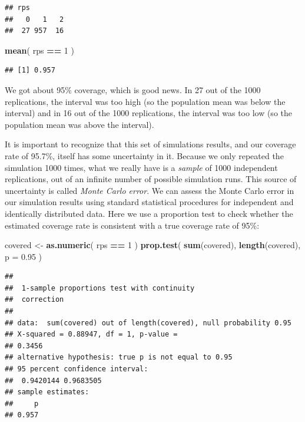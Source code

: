 \documentclass[
]{book}
\newenvironment{Shaded}{\begin{snugshade}}{\end{snugshade}}
\newcommand{\AttributeTok}[1]{\textcolor[rgb]{0.13,0.29,0.53}{#1}}
\newcommand{\DecValTok}[1]{\textcolor[rgb]{0.00,0.00,0.81}{#1}}
\newcommand{\FloatTok}[1]{\textcolor[rgb]{0.00,0.00,0.81}{#1}}
\newcommand{\FunctionTok}[1]{\textcolor[rgb]{0.13,0.29,0.53}{\textbf{#1}}}
\newcommand{\NormalTok}[1]{#1}
\newcommand{\OtherTok}[1]{\textcolor[rgb]{0.56,0.35,0.01}{#1}}
\newcommand{\SpecialCharTok}[1]{\textcolor[rgb]{0.81,0.36,0.00}{\textbf{#1}}}
\begin{document}
\begin{verbatim}
## rps
##   0   1   2 
##  27 957  16
\end{verbatim}

\begin{Shaded}
\begin{Highlighting}[]
\FunctionTok{mean}\NormalTok{( rps }\SpecialCharTok{==} \DecValTok{1}\NormalTok{ )}
\end{Highlighting}
\end{Shaded}

\begin{verbatim}
## [1] 0.957
\end{verbatim}

We got about 95\% coverage, which is good news. In 27 out of the 1000 replications, the interval was too high (so the population mean was below the interval) and in 16 out of the 1000 replications, the interval was too low (so the population mean was above the interval).

It is important to recognize that this set of simulations results, and our coverage rate of 95.7\%, itself has some uncertainty in it.
Because we only repeated the simulation 1000 times, what we really have is a \emph{sample} of 1000 independent replications, out of an infinite number of possible simulation runs.
This source of uncertainty is called \emph{Monte Carlo error}.
We can assess the Monte Carlo error in our simulation results using standard statistical procedures for independent and identically distributed data.
Here we use a proportion test to check whether the estimated coverage rate is consistent with a true coverage rate of 95\%:

\begin{Shaded}
\begin{Highlighting}[]
\NormalTok{covered }\OtherTok{\textless{}{-}} \FunctionTok{as.numeric}\NormalTok{( rps }\SpecialCharTok{==} \DecValTok{1}\NormalTok{ )}
\FunctionTok{prop.test}\NormalTok{( }\FunctionTok{sum}\NormalTok{(covered), }\FunctionTok{length}\NormalTok{(covered), }\AttributeTok{p =} \FloatTok{0.95}\NormalTok{ )}
\end{Highlighting}
\end{Shaded}

\begin{verbatim}
## 
##  1-sample proportions test with continuity
##  correction
## 
## data:  sum(covered) out of length(covered), null probability 0.95
## X-squared = 0.88947, df = 1, p-value =
## 0.3456
## alternative hypothesis: true p is not equal to 0.95
## 95 percent confidence interval:
##  0.9420144 0.9683505
## sample estimates:
##     p 
## 0.957
\end{verbatim}
\end{document}
